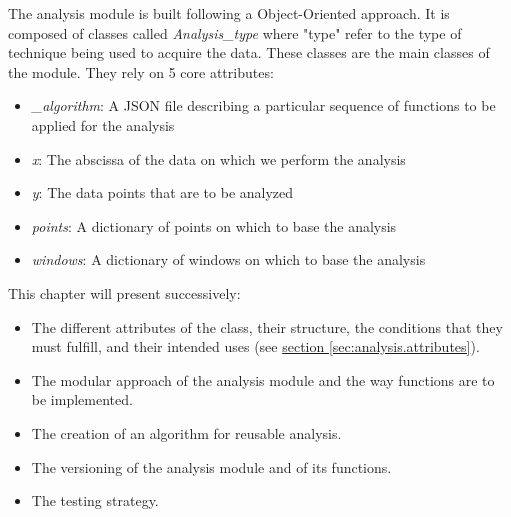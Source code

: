 The analysis module is built following a Object-Oriented approach. It is composed of classes called \textit{Analysis\_type} where "type" refer to the type of technique being used to acquire the data. These classes are the main classes of the module. They rely on 5 core attributes:
\begin{itemize}
    \item \textit{\_algorithm}: A JSON file describing a particular sequence of functions to be applied for the analysis
    \item \textit{x}: The abscissa of the data on which we perform the analysis
    \item \textit{y}: The data points that are to be analyzed
    \item \textit{points}: A dictionary of points on which to base the analysis
    \item \textit{windows}: A dictionary of windows on which to base the analysis
\end{itemize}

This chapter will present successively:
\begin{itemize}
    \item The different attributes of the class, their structure, the conditions that they must fulfill, and their intended uses (see \hyperref[sec:analysis.attributes]{section \ref{sec:analysis.attributes}}).
    \item The modular approach of the analysis module and the way functions are to be implemented. 
    \item The creation of an algorithm for reusable analysis.
    \item The versioning of the analysis module and of its functions.
    \item The testing strategy.
\end{itemize}


